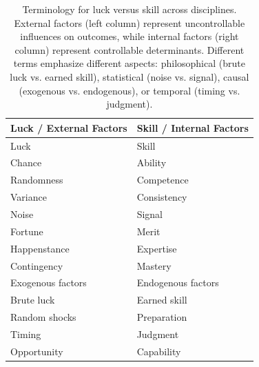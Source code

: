 \begin{table}[H]
  \centering
  \begin{tabular}{ll}
    \toprule \textbf{Luck / External Factors} & \textbf{Skill / Internal Factors} \\
    \midrule Luck                             & Skill                             \\
    Chance                                    & Ability                           \\
    Randomness                                & Competence                        \\
    Variance                                  & Consistency                       \\
    Noise                                     & Signal                            \\
    Fortune                                   & Merit                             \\
    Happenstance                              & Expertise                         \\
    Contingency                               & Mastery                           \\
    Exogenous factors                         & Endogenous factors                \\
    Brute luck                                & Earned skill                      \\
    Random shocks                             & Preparation                       \\
    Timing                                    & Judgment                          \\
    Opportunity                               & Capability                        \\
    \bottomrule
  \end{tabular}
  \caption{Terminology for luck versus skill across disciplines. External
  factors (left column) represent uncontrollable influences on outcomes,
  while internal factors (right column) represent controllable
  determinants. Different terms emphasize different aspects:
  philosophical (brute luck vs. earned skill), statistical (noise vs.
  signal), causal (exogenous vs. endogenous), or temporal (timing vs.
  judgment).}
  \label{tab:terminology}
\end{table}

